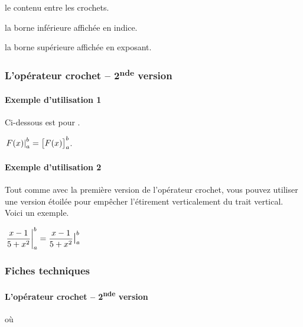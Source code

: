 \documentclass[12pt,a4paper]{article}
\begin{document}


 le contenu entre les crochets.

 la borne inférieure affichée en indice.

 la borne supérieure affichée en exposant.




\subsubsection{L'opérateur crochet -- 2\textsuperscript{nde} version}

\paragraph{Exemple d'utilisation 1}

Ci-dessous  est pour .

\begin{latexex}
$\vhook{F(x)}{a}{b}
 = \hook{F(x)}{a}{b}$.
\end{latexex}




\paragraph{Exemple d'utilisation 2}

Tout comme avec la première version de l'opérateur crochet, vous pouvez utiliser une version étoilée pour empêcher l'étirement verticalement du trait vertical. Voici un exemple.

\begin{latexex}
$\displaystyle
 \vhook{\frac{x - 1}{5 + x^2}}{a}{b}
 = \vhook*{\frac{x - 1}{5 + x^2}}{a}{b}$
\end{latexex}




\subsubsection{Fiches techniques}

\paragraph{L'opérateur crochet -- 2\textsuperscript{nde} version}

   où \quad {}
\end{document}
